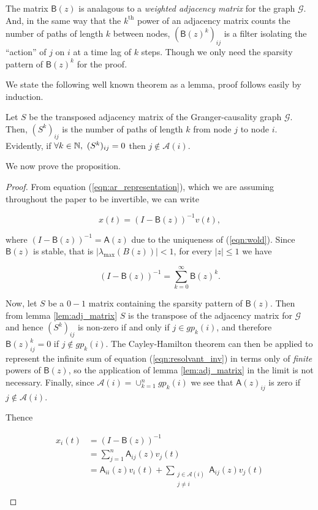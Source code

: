 \documentclass[12pt]{article}
\def\gcg{\mathcal{G}}  %
\def\B{\mathsf{B}}  %
\def\A{\mathsf{A}}  %
\newcommand{\anc}[1]{\mathcal{A}(#1)}  %
\newcommand{\gpn}[2]{gp_{#1}(#2)}  %
\begin{document}
The matrix $\B(z)$ is analagous to a \textit{weighted adjacency
  matrix} for the graph $\gcg$.  And, in the same way that the
$k^{\text{th}}$ power of an adjacency matrix counts the number of
paths of length $k$ between nodes, $(\B(z)^k)_{ij}$ is a filter
isolating the ``action'' of $j$ on $i$ at a time lag of $k$ steps.
Though we only need the sparsity pattern of $\B(z)^k$ for the proof.

We state the following well known theorem as a lemma, proof follows
easily by induction.

\begin{lemma}
  \label{lem:adj_matrix}
  Let $S$ be the transposed adjacency matrix of the Granger-causality
  graph $\gcg$.  Then, $(S^k)_{ij}$ is the number of paths of length
  $k$ from node $j$ to node $i$.  Evidently, if
  $\forall k \in \mathbb{N},\ (S^k)_{ij} = 0$ then $j \not\in \anc{i}$.
\end{lemma}

We now prove the proposition.

\begin{proof}
  From equation (\ref{eqn:ar_representation}), which we are assuming
  throughout the paper to be invertible, we can write

  \begin{equation*}
    x(t) = (I - \B(z))^{-1} v(t),
  \end{equation*}

  where $(I - \B(z))^{-1} = \A(z)$ due to the uniqueness of
  (\ref{eqn:wold}).  Since $\B(z)$ is stable, that is
  $|\lambda_{\text{max}}(B(z))| < 1$, for every $|z| \le 1$ we have

  \begin{equation}
    \label{eqn:resolvant_inv}
    (I - \B(z))^{-1} = \sum_{k = 0}^\infty \B(z)^k.
  \end{equation}

  Now, let $S$ be a $0-1$ matrix containing the sparsity pattern of
  $\B(z)$.  Then from lemma \ref{lem:adj_matrix} $S$ is the transpose
  of the adjacency matrix for $\gcg$ and hence $(S^k)_{ij}$ is
  non-zero if and only if $j \in \gpn{k}{i}$, and therefore
  $\B(z)^k_{ij} = 0$ if $j \not \in \gpn{k}{i}$.  The Cayley-Hamilton
  theorem can then be applied to represent the infinite sum of equation
  (\ref{eqn:resolvant_inv}) in terms only of \textit{finite} powers of
  $\B(z)$, so the application of lemma \ref{lem:adj_matrix} in the
  limit is not necessary.  Finally, since $\anc{i} = \cup_{k = 1}^n\gpn{k}{i}$
  we see that $\A(z)_{ij}$ is zero if $j \not\in \anc{i}$.

  Thence

  \begin{align*}
    x_i(t) &= (I - \B(z))^{-1}\\
    &= \sum_{j = 1}^n \A_{ij}(z) v_j(t)\\
    &= \A_{ii}(z) v_i(t) + \sum_{\substack{j \in \anc{i} \\ j \ne i}} \A_{ij}(z) v_j(t)\\
  \end{align*}
\end{proof}
\end{document}
